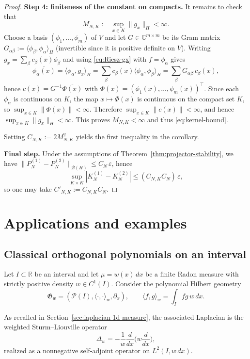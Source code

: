 \documentclass{amsart}
\numberwithin{equation}{section}
\theoremstyle{definition}
\theoremstyle{remark}
\begin{document}
\begin{proof}
\smallskip
\noindent\textbf{Step 4: finiteness of the constant on compacts.}
It remains to check that
\[
M_{N,K}:=\sup_{x\in K}\|g_x\|_H<\infty.
\]
Choose a basis $(\phi_1,\dots,\phi_m)$ of $V$ and let $G\in\mathbb C^{m\times m}$ be its Gram matrix
$G_{\alpha\beta}:=\langle \phi_\beta,\phi_\alpha\rangle_H$ (invertible since it is positive definite on $V$).
Writing $g_x=\sum_{\beta} c_\beta(x)\phi_\beta$ and using \eqref{eq:Riesz-gx} with $f=\phi_\alpha$ gives
\[
\overline{\phi_\alpha(x)}=\langle \phi_\alpha,g_x\rangle_H=\sum_{\beta} c_\beta(x)\langle \phi_\alpha,\phi_\beta\rangle_H
=\sum_{\beta} G_{\alpha\beta}\,c_\beta(x),
\]
hence $c(x)=G^{-1}\overline{\Phi(x)}$ with $\Phi(x)=(\phi_1(x),\dots,\phi_m(x))^\top$.
Since each $\phi_\alpha$ is continuous on $K$, the map $x\mapsto \Phi(x)$ is continuous on the compact set $K$,
so $\sup_{x\in K}\|\Phi(x)\|<\infty$. Therefore $\sup_{x\in K}\|c(x)\|<\infty$, and hence
$\sup_{x\in K}\|g_x\|_H<\infty$. This proves $M_{N,K}<\infty$ and thus \eqref{eq:kernel-bound}.

Setting $C_{N,K}:=2M_{N,K}^2$ yields the first inequality in the corollary.

\smallskip
\noindent\textbf{Final step.}
Under the assumptions of Theorem~\ref{thm:projector-stability}, we have
$\|P_N^{(1)}-P_N^{(2)}\|_{\mathcal B(H)}\le C_N\,\varepsilon$, hence
\[
\sup_{K\times K}|K_N^{(1)}-K_N^{(2)}|\le (C_{N,K}C_N)\,\varepsilon,
\]
so one may take $C'_{N,K}:=C_{N,K}C_N$.
\end{proof}

\section{Applications and examples}
\label{sec:examples}

\subsection{Classical orthogonal polynomials on an interval}

Let $I\subset\mathbb R$ be an interval and let $\mu=w(x)\,dx$ be a finite Radon measure
with strictly positive density $w\in C^1(I)$.
Consider the polynomial Hilbert geometry
\[
\mathfrak G_w=(\mathcal P(I),\langle\cdot,\cdot \rangle_w,\partial_x),
\qquad
\langle f,g\rangle_w=\int_I f g\,w\,dx.
\]

As recalled in Section~\ref{sec:laplacian-1d-measure}, the associated Laplacian is the
weighted Sturm--Liouville operator
\[
\Delta_w=-\frac1w\frac{d}{dx}\Big(w\frac{d}{dx}\Big),
\]
realized as a nonnegative self-adjoint operator on $L^2(I,w\,dx)$.
\end{document}
